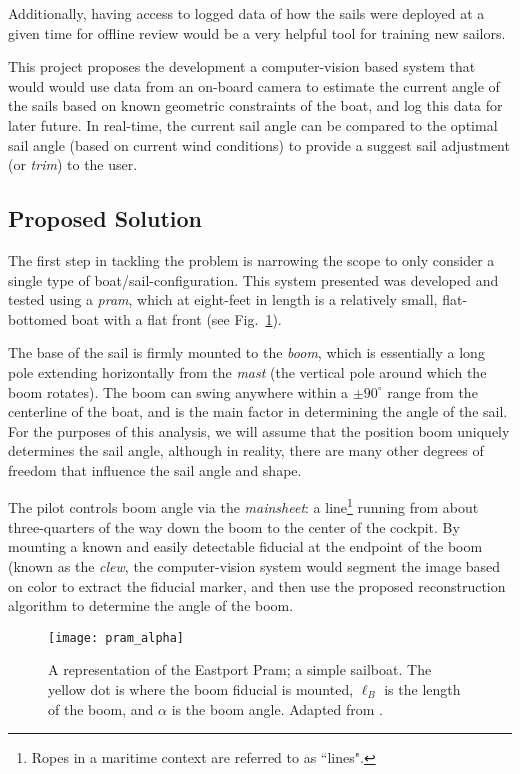 \documentclass[letterpaper, 10 pt, conference]{ieeeconf}  %
\begin{document}
Additionally, having access to logged data of how the sails were deployed at a given time for offline review would be a very helpful tool for training new sailors. 

This project proposes the development a computer-vision based system that would would use data from an on-board camera to estimate the current angle of the sails based on known geometric constraints of the boat, and log this data for later future. In real-time, the current sail angle can be compared to the optimal sail angle (based on current wind conditions) to provide a suggest sail adjustment (or \emph{trim}) to the user. 

\subsection{Proposed Solution}
The first step in tackling the problem is narrowing the scope to only consider a single type of boat/sail-configuration. This system presented was developed and tested using a \emph{pram}, which at eight-feet in length is a relatively small, flat-bottomed boat with a flat front (see Fig.~\ref{fig:pram}).

The base of the sail is firmly mounted to the \emph{boom}, which is essentially a long pole extending horizontally from the \emph{mast} (the vertical pole around which the boom rotates). The boom can swing anywhere within a $\pm 90^\circ$ range from the centerline of the boat, and is the main factor in determining the angle of the sail. For the purposes of this analysis, we will assume that the position boom uniquely determines the sail angle, although in reality, there are many other degrees of freedom that influence the sail angle and shape.

 The pilot controls boom angle via the \emph{mainsheet}: a line\footnote{Ropes in a maritime context are referred to as ``lines".} running from about three-quarters of the way down the boom to the center of the cockpit. By mounting a known and easily detectable fiducial at the endpoint of the boom (known as the \emph{clew}, the computer-vision system would segment the image based on color to extract the fiducial marker, and then use the proposed reconstruction algorithm to determine the angle of the boom.
 
\begin{figure}[htbp]
   \centering
   \texttt{[image: pram\_alpha]} 
   \caption{A representation of the Eastport Pram; a simple sailboat. The yellow dot is where the boom fiducial is mounted, $\ell_B$ is the length of the boom, and $\alpha$ is the boom angle. Adapted from \cite{clc:pram}.}
   \label{fig:pram}
\end{figure}
\end{document}
